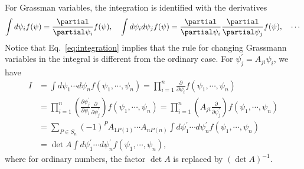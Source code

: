 For Grassman variables, the integration is identified with the derivatives
\begin{equation}\label{eq:integration}
	\int d\psi_i f(\p) = \frac{\partial}{\partial \psi_i} f(\p), \quad
	\int d\psi_i d\p_j f(\p) = \frac{\partial}{\partial \psi_i} \frac{\partial}{\partial \psi_j}f(\p),\quad \cdots
\end{equation}
Notice that Eq.~\eqref{eq:integration} implies that the rule for changing Grassmann variables in the integral is different from the ordinary case. 
For $\psi_j^\prime = A_{ji}\psi_i$, we have
\begin{equation}
    \begin{aligned}
    I &= \int d\psi_1\cdots d\psi_n f(\psi_1,\cdots,\psi_n) = \prod_{i=1}^n \frac{\partial}{\partial \psi_i} f(\psi_1,\cdots,\psi_n)\\
    &= \prod_{i=1}^n (\frac{\partial \psi^\prime_j}{\partial \psi_i}\frac{\partial}{\partial \psi_j^\prime} )f(\psi_1,\cdots,\psi_n)
    = \prod_{i=1}^n (A_{ji}\frac{\partial}{\partial \psi_j^\prime}) f(\psi_1,\cdots,\psi_n) \\
	&= \sum_{P\in S_n} (-1)^P A_{1 P(1)}\cdots A_{n P(n)} \int d\psi^\prime_1\cdots d\psi^\prime_n f(\psi_1,\cdots,\psi_n)\\
	&= \operatorname{det}A \int d\psi^\prime_1\cdots d\psi^\prime_n f(\psi_1,\cdots,\psi_n),
    \end{aligned}
\end{equation}
where for ordinary numbers, the factor $\operatorname{det} A$ is replaced by $(\operatorname{det} A)^{-1}$.

